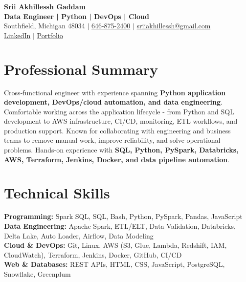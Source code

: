 \documentclass[letterpaper,10pt]{article}
\begin{document}
\fontsize{9.35pt}{10.45pt}\selectfont

\begin{center}
    {\LARGE \textbf{Srii Akhillessh Gaddam}} \\[-1pt]
    \textbf{Data Engineer | Python | DevOps | Cloud} \\[2pt]
    Southfield, Michigan 48034 $|$
    \href{tel:6468752400}{646-875-2400} $|$
    \href{mailto:sriiakhillessh@gmail.com}{sriiakhillessh@gmail.com} \\[1pt]
    \href{https://www.linkedin.com/in/srii-akhiilessh-gaddam-b48668191/}{LinkedIn} $|$
    \href{https://sriiakhillesshg.github.io/portfolio/}{Portfolio}
\end{center}
\vspace{-8pt}

\section{Professional Summary}
\small{Cross-functional engineer with experience spanning \textbf{Python application development, DevOps/cloud automation, and data engineering}. Comfortable working across the application lifecycle - from Python and SQL development to AWS infrastructure, CI/CD, monitoring, ETL workflows, and production support. Known for collaborating with engineering and business teams to remove manual work, improve reliability, and solve operational problems. Hands-on experience with \textbf{SQL, Python, PySpark, Databricks, AWS, Terraform, Jenkins, Docker, and data pipeline automation}.}

\section{Technical Skills}
\small{
\textbf{Programming:} Spark SQL, SQL, Bash, Python, PySpark, Pandas, JavaScript \\
\textbf{Data Engineering:} Apache Spark, ETL/ELT, Data Validation, Databricks, Delta Lake, Auto Loader, Airflow, Data Modeling \\
\textbf{Cloud \& DevOps:} Git, Linux, AWS (S3, Glue, Lambda, Redshift, IAM, CloudWatch), Terraform, Jenkins, Docker, GitHub, CI/CD \\
\textbf{Web \& Databases:} REST APIs, HTML, CSS, JavaScript, PostgreSQL, Snowflake, Greenplum
}

\end{document}
